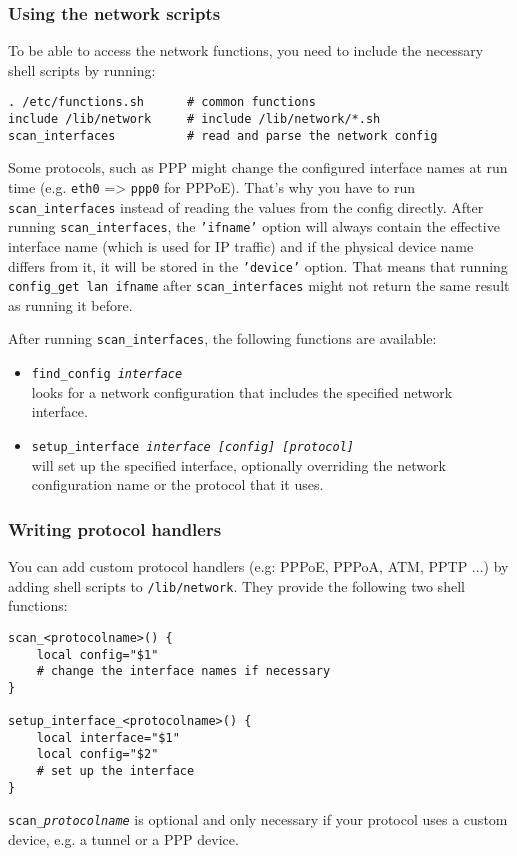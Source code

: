 \subsubsection{Using the network scripts}

To be able to access the network functions, you need to include
the necessary shell scripts by running:

\begin{Verbatim}
. /etc/functions.sh      # common functions
include /lib/network     # include /lib/network/*.sh
scan_interfaces          # read and parse the network config
\end{Verbatim}

Some protocols, such as PPP might change the configured interface names
at run time (e.g. \texttt{eth0} => \texttt{ppp0} for PPPoE). That's why you have to run
\texttt{scan\_interfaces} instead of reading the values from the config directly.
After running \texttt{scan\_interfaces}, the \texttt{'ifname'} option will always contain
the effective interface name (which is used for IP traffic) and if the
physical device name differs from it, it will be stored in the \texttt{'device'}
option.
That means that running \texttt{config\_get lan ifname}
after \texttt{scan\_interfaces} might not return the same result as running it before.

After running \texttt{scan\_interfaces}, the following functions are available:

\begin{itemize}
    \item{\texttt{find\_config \textit{interface}}} \\
        looks for a network configuration that includes
        the specified network interface.

    \item{\texttt{setup\_interface \textit{interface [config] [protocol]}}} \\
      will set up the specified interface, optionally overriding the network configuration
      name or the protocol that it uses.
\end{itemize}

\subsubsection{Writing protocol handlers}

You can add custom protocol handlers (e.g: PPPoE, PPPoA, ATM, PPTP ...)
by adding shell scripts to \texttt{/lib/network}. They provide the following
two shell functions:

\begin{Verbatim}
scan_<protocolname>() {
    local config="$1"
    # change the interface names if necessary
}

setup_interface_<protocolname>() {
    local interface="$1"
    local config="$2"
    # set up the interface
}
\end{Verbatim}

\texttt{scan\_\textit{protocolname}} is optional and only necessary if your protocol
uses a custom device, e.g. a tunnel or a PPP device.

